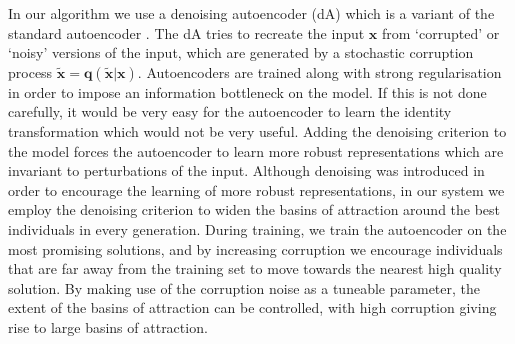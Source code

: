\documentclass[runningheads,a4paper]{llncs}
\begin{document}
In our algorithm we use a denoising autoencoder (dA) which is a variant of the standard autoencoder \cite{vincent2008extracting}. The dA tries to recreate the input $\mathbf x$ from `corrupted' or `noisy' versions of the input, which are generated by a stochastic corruption process $\mathbf{\tilde x = q(\tilde x|x)}$. Autoencoders are trained along with strong regularisation in order to impose an information bottleneck on the model. If this is not done carefully, it would be very easy for the autoencoder to learn the identity transformation which would not be very useful. Adding the denoising criterion to the model forces the autoencoder to learn more robust representations which are invariant to perturbations of the input. Although denoising was introduced in order to encourage the learning of more robust representations, in our system we employ the denoising criterion to widen the basins of attraction around the best individuals in every generation. During training, we train the autoencoder on the most promising solutions, and by increasing corruption we encourage individuals that are far away from the training set to move towards the nearest high quality solution. By making use of the corruption noise as a tuneable parameter, the extent of the basins of attraction can be controlled, with high corruption giving rise to large basins of attraction.


 





 
\end{document}
